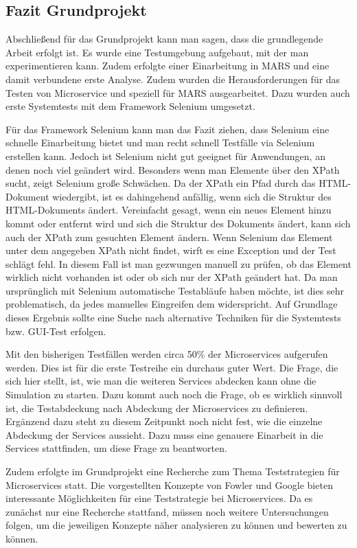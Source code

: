 \documentclass{llncs}
\begin{document}
\subsection{Fazit Grundprojekt}
Abschließend für das Grundprojekt kann man sagen, dass die grundlegende Arbeit erfolgt ist. Es wurde eine Testumgebung aufgebaut, mit der man experimentieren kann. Zudem erfolgte einer Einarbeitung in MARS und eine damit verbundene erste Analyse. Zudem wurden die Herausforderungen für das Testen von Microservice und speziell für MARS ausgearbeitet. Dazu wurden auch erste Systemtests mit dem Framework Selenium umgesetzt.

Für das Framework Selenium kann man das Fazit ziehen, dass Selenium eine schnelle Einarbeitung bietet und man recht schnell Testfälle via Selenium erstellen kann. Jedoch ist Selenium nicht gut geeignet für Anwendungen, an denen noch viel geändert wird. Besonders wenn man Elemente über den XPath sucht, zeigt Selenium große Schwächen. Da der XPath ein Pfad durch das HTML-Dokument wiedergibt, ist es dahingehend anfällig, wenn sich die Struktur des HTML-Dokuments ändert. Vereinfacht gesagt, wenn ein neues Element hinzu kommt oder entfernt wird und sich die Struktur des Dokuments ändert, kann sich auch der XPath zum gesuchten Element ändern. Wenn Selenium das Element unter dem angegeben XPath nicht findet, wirft es eine Exception und der Test schlägt fehl. In diesem Fall ist man gezwungen manuell zu prüfen, ob das Element wirklich nicht vorhanden ist oder ob sich nur der XPath geändert hat. Da man ursprünglich mit Selenium automatische Testabläufe haben möchte, ist dies sehr problematisch, da jedes manuelles Eingreifen dem widerspricht. Auf Grundlage dieses Ergebnis sollte eine Suche nach alternative Techniken für die Systemtests bzw. GUI-Test erfolgen.

Mit den bisherigen Testfällen werden circa 50\% der Microservices aufgerufen werden. Dies ist für die erste Testreihe ein durchaus guter Wert. Die Frage, die sich hier stellt, ist, wie man die weiteren Services abdecken kann ohne die Simulation zu starten. Dazu kommt auch noch die Frage, ob es wirklich sinnvoll ist, die Testabdeckung nach Abdeckung der Microservices zu definieren. Ergänzend dazu steht zu diesem Zeitpunkt noch nicht fest, wie die einzelne Abdeckung der Services aussieht. Dazu muss eine genauere Einarbeit in die Services stattfinden, um diese Frage zu beantworten.

Zudem erfolgte im Grundprojekt eine Recherche zum Thema Teststrategien für Microservices statt. Die vorgestellten Konzepte von Fowler und Google bieten interessante Möglichkeiten für eine Teststrategie bei Microservices. Da es zunächst nur eine Recherche stattfand, müssen noch weitere Untersuchungen folgen, um die jeweiligen Konzepte näher analysieren zu können und bewerten zu können. 
\end{document}
